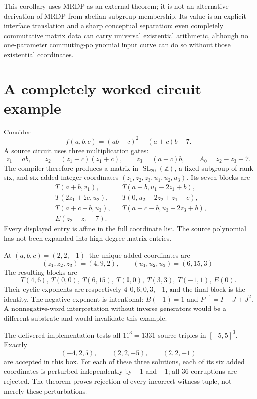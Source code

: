 \documentclass[11pt,letterpaper]{article}
\theoremstyle{definition}
\theoremstyle{remark}
\newcommand{\Z}{\mathbb Z}
\newcommand{\SL}{\operatorname{SL}}
\begin{document}
This corollary uses MRDP as an external theorem; it is not an alternative derivation of MRDP from abelian subgroup membership. Its value is an explicit interface translation and a sharp conceptual separation: even completely commutative matrix data can carry universal existential arithmetic, although no one-parameter commuting-polynomial input curve can do so without those existential coordinates.

\section{A completely worked circuit example}\label{gts:ai:sec:worked}
Consider
\begin{equation}\label{gts:ai:eq:examplepoly}
 f(a,b,c)=(ab+c)^2-(a+c)b-7.
\end{equation}
A source circuit uses three multiplication gates:
\[
 z_1=ab,\qquad z_2=(z_1+c)(z_1+c),\qquad z_3=(a+c)b,
 \qquad A_0=z_2-z_3-7.
\]
The compiler therefore produces a matrix in $\SL_{20}(\Z)$, a fixed subgroup of rank six, and six added integer coordinates $(z_1,z_2,z_3,u_1,u_2,u_3)$. Its seven blocks are
\begin{align*}
 &T(a+b,u_1),&&T(a-b,u_1-2z_1+b),\\
 &T(2z_1+2c,u_2),&&T(0,u_2-2z_2+z_1+c),\\
 &T(a+c+b,u_3),&&T(a+c-b,u_3-2z_3+b),\\
 &E(z_2-z_3-7).&&
\end{align*}
Every displayed entry is affine in the full coordinate list. The source polynomial has not been expanded into high-degree matrix entries.

At $(a,b,c)=(2,2,-1)$, the unique added coordinates are
\[
 (z_1,z_2,z_3)=(4,9,2),\qquad
 (u_1,u_2,u_3)=(6,15,3).
\]
The resulting blocks are
\[
 T(4,6),\ T(0,0),\ T(6,15),\ T(0,0),\ T(3,3),\ T(-1,1),\ E(0).
\]
Their cyclic exponents are respectively $4,0,6,0,3,-1$, and the final block is the identity. The negative exponent is intentional: $B(-1)=1$ and $P^{-1}=I-J+J^2$. A nonnegative-word interpretation without inverse generators would be a different substrate and would invalidate this example.

The delivered implementation tests all $11^3=1331$ source triples in $[-5,5]^3$. Exactly
\[
 (-4,2,5),\qquad (2,2,-5),\qquad (2,2,-1)
\]
are accepted in this box. For each of these three solutions, each of its six added coordinates is perturbed independently by $+1$ and $-1$; all 36 corruptions are rejected. The theorem proves rejection of every incorrect witness tuple, not merely these perturbations.
\end{document}
